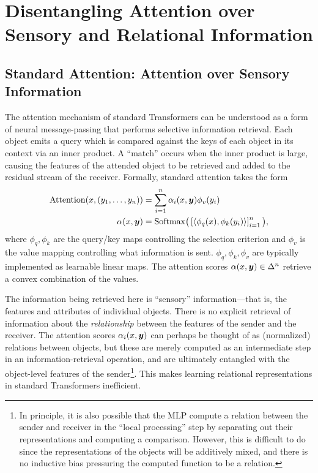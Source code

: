 \section{Disentangling Attention over Sensory and Relational Information}

\subsection{Standard Attention: Attention over Sensory Information}

The attention mechanism of standard Transformers can be understood as a form of neural message-passing that performs selective information retrieval. Each object emits a query which is compared against the keys of each object in its context via an inner product. A ``match'' occurs when the inner product is large, causing the features of the attended object to be retrieved and added to the residual stream of the receiver. Formally, standard attention takes the form
\begin{equation}\label{eq:self_attn}
  \begin{split}
    \mathrm{Attention}(x, (y_1, \ldots, y_n)) &= \sum_{i=1}^{n} \alpha_i(x, \bm{y}) \phi_v(y_i) \\
    \alpha(x, \bm{y}) &= \mathrm{Softmax}\big(\left[\left \langle \phi_q(x), \phi_k(y_i) \right\rangle\right]_{i=1}^{n}\big),
  \end{split}
\end{equation}
where $\phi_q,\phi_k$ are the query/key maps controlling the selection criterion and $\phi_v$ is the value mapping controlling what information is sent. $\phi_q, \phi_k, \phi_v$ are typically implemented as learnable linear maps. The attention scores $\alpha(x, \bm{y}) \in \Delta^n$ retrieve a convex combination of the values.

The information being retrieved here is ``sensory'' information---that is, the features and attributes of individual objects. There is no explicit retrieval of information about the \textit{relationship} between the features of the sender and the receiver. The attention scores $\alpha_i(x, \bm{y})$ can perhaps be thought of as (normalized) relations between objects, but these are merely computed as an intermediate step in an information-retrieval operation, and are ultimately entangled with the object-level features of the sender\footnote{In principle, it is also possible that the MLP compute a relation between the sender and receiver in the ``local processing'' step by separating out their representations and computing a comparison. However, this is difficult to do since the representations of the objects will be additively mixed, and there is no inductive bias pressuring the computed function to be a relation.}. This makes learning relational representations in standard Transformers inefficient.

